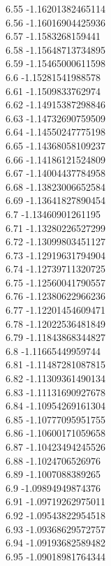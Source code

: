 {6.55	-1.16201382465114\\
6.56	-1.16016904425936\\
6.57	-1.1583268159441\\
6.58	-1.15648713734895\\
6.59	-1.15465000611598\\
6.6	-1.15281541988578\\
6.61	-1.1509833762974\\
6.62	-1.14915387298846\\
6.63	-1.14732690759509\\
6.64	-1.14550247775198\\
6.65	-1.14368058109237\\
6.66	-1.14186121524809\\
6.67	-1.14004437784958\\
6.68	-1.13823006652584\\
6.69	-1.13641827890454\\
6.7	-1.13460901261195\\
6.71	-1.13280226527299\\
6.72	-1.13099803451127\\
6.73	-1.12919631794904\\
6.74	-1.12739711320725\\
6.75	-1.12560041790557\\
6.76	-1.12380622966236\\
6.77	-1.12201454609471\\
6.78	-1.12022536481849\\
6.79	-1.11843868344827\\
6.8	-1.11665449959744\\
6.81	-1.11487281087815\\
6.82	-1.11309361490134\\
6.83	-1.11131690927678\\
6.84	-1.10954269161304\\
6.85	-1.10777095951755\\
6.86	-1.10600171059658\\
6.87	-1.10423494245526\\
6.88	-1.1024706526976\\
6.89	-1.1007088389265\\
6.9	-1.09894949874376\\
6.91	-1.09719262975011\\
6.92	-1.09543822954518\\
6.93	-1.09368629572757\\
6.94	-1.09193682589482\\
6.95	-1.09018981764344\\
}
